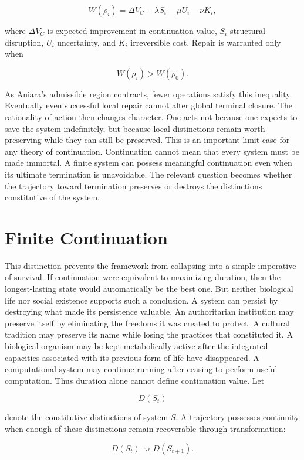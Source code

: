 \documentclass[11pt,oneside]{book}
\theoremstyle{definition}
\theoremstyle{remark}
\begin{document}
\[
W(\rho_i) = \Delta V_C - \lambda S_i - \mu U_i - \nu K_i,
\]

where \(\Delta V_C\) is expected improvement in continuation value, \(S_i\) structural disruption,
\(U_i\) uncertainty, and \(K_i\) irreversible cost. Repair is warranted only when

\[
W(\rho_i)>W(\rho_0).
\]

As Aniara's admissible region contracts, fewer operations satisfy this inequality. Eventually even
successful local repair cannot alter global terminal closure. The rationality of action then changes
character. One acts not because one expects to save the system indefinitely, but because local
distinctions remain worth preserving while they can still be preserved. This is an important limit
case for any theory of continuation. Continuation cannot mean that every system must be made
immortal. A finite system can possess meaningful continuation even when its ultimate termination is
unavoidable. The relevant question becomes whether the trajectory toward termination preserves or
destroys the distinctions constitutive of the system.

\section{Finite Continuation}

This distinction prevents the framework from collapsing into a simple imperative of survival. If
continuation were equivalent to maximizing duration, then the longest-lasting state would
automatically be the best one. But neither biological life nor social existence supports such a
conclusion. A system can persist by destroying what made its persistence valuable. An authoritarian
institution may preserve itself by eliminating the freedoms it was created to protect. A cultural
tradition may preserve its name while losing the practices that constituted it. A biological
organism may be kept metabolically active after the integrated capacities associated with its
previous form of life have disappeared. A computational system may continue running after ceasing to
perform useful computation. Thus duration alone cannot define continuation value. Let

\[
D(S_t)
\]

denote the constitutive distinctions of system \(S\). A trajectory possesses continuity when enough
of these distinctions remain recoverable through transformation:

\[
D(S_t) \rightsquigarrow D(S_{t+1}).
\]
\end{document}
